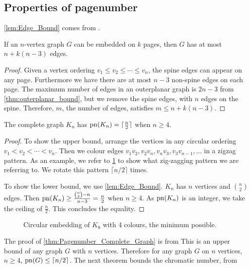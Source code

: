 \subsection{Properties of pagenumber}\label{ssec:Related_Properties}
\cref{lem:Edge_Bound} comes from \textcite{bernhartBookThicknessGraph1979}.
\begin{lemma}\label{lem:Edge_Bound}
	If an \(n\)-vertex graph \(G\) can be embedded on $k$ pages, then \(G\) has at most \(n + k(n-3)\) edges.
\end{lemma}
\begin{proof}
	Given a vertex ordering \(v_1 \leq v_2 \leq \cdots \leq v_n\), the spine edges can appear on any page. Furthermore we have there are at most \(n-3\) non-spine edges on each page. The maximum number of edges in an outerplanar graph is \(2n - 3\) from \cref{thm:outerplanar_bound}, but we remove the spine edges, with \(n\) edges on the spine. Therefore, \(m\), the number of edges, satisfies \(m \leq n + k (n - 3)\).
\end{proof}
\begin{theorem}[]\label{thm:Pagenumber_Complete_Graph}
	The complete graph $K_n$ has $\operatorname{pn}(K_n) = \lceil \frac{n}{2} \rceil$ when $n \geq 4$.
\end{theorem}
\begin{proof}
	To show the upper bound, arrange the vertices in any circular ordering $v_1 < v_2 < \cdots < v_n$. Then we colour edges $v_1 v_2, v_2 v_{n}, v_{n} v_{3}, v_{3} v_{n-1}, \ldots$ in a zigzag pattern. As an example, we refer to \cref{fig:k8 coloured with colours} to show what zig-zagging pattern we are referring to. We rotate this pattern $\lceil n/2 \rceil$ times. 
	\par
	To show the lower bound, we use \cref{lem:Edge_Bound}. \(K_n\) has \(n\) vertices and \(\binom{n}{2}\) edges. Then \(\operatorname{pn}(K_n) \geq \frac{\binom{n}{2} - n}{n - 3} = \frac{n}{2}\) when \(n \geq 4\). As \(\operatorname{pn}(K_n)\) is an integer, we take the ceiling of \(\frac{n}{2}\). This concludes the equality.
\end{proof}
\begin{figure}[ht]
	\caption{Circular embedding of \(K_8\) with 4 colours, the minimum possible.}
	\centering
	\label{fig:k8 coloured with colours}
\end{figure}
The proof of \cref{thm:Pagenumber_Complete_Graph} is from \textcite{bernhartBookThicknessGraph1979}
This is an upper bound of any graph \(G\) with \(n\) vertices.
Therefore for any graph \(G\) on \(n\) vertices, \(n \geq 4\), \(\operatorname{pn}(G) \leq \lceil n/2 \rceil\). The next theorem bounds the chromatic number, from \textcite{bernhartBookThicknessGraph1979}
